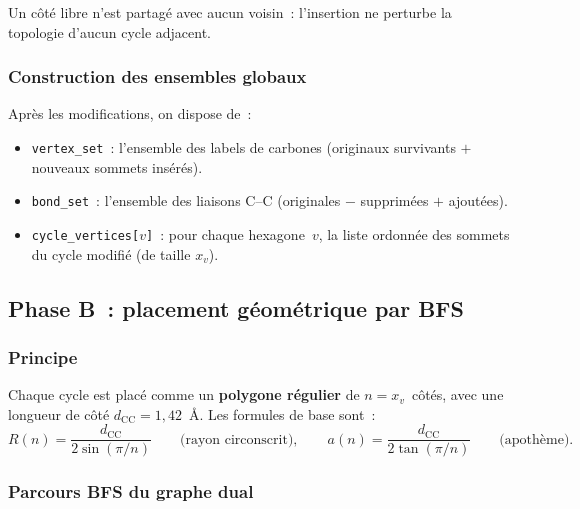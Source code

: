 \documentclass[12pt,a4paper]{article}
\theoremstyle{definition}
\theoremstyle{remark}
\begin{document}
Un c\^ot\'e libre n'est partag\'e avec aucun voisin~: l'insertion ne
perturbe la topologie d'aucun cycle adjacent.

\subsubsection{Construction des ensembles globaux}

Apr\`es les modifications, on dispose de~:
\begin{itemize}[nosep]
  \item \texttt{vertex\_set}~: l'ensemble des labels de carbones
        (originaux survivants $+$ nouveaux sommets ins\'er\'es).
  \item \texttt{bond\_set}~: l'ensemble des liaisons C--C
        (originales $-$ supprim\'ees $+$ ajout\'ees).
  \item \texttt{cycle\_vertices[$v$]}~: pour chaque hexagone~$v$, la liste
        ordonn\'ee des sommets du cycle modifi\'e (de taille $x_v$).
\end{itemize}


\subsection{Phase B~: placement g\'eom\'etrique par BFS}

\subsubsection{Principe}

Chaque cycle est plac\'e comme un \textbf{polygone r\'egulier} de
$n = x_v$~c\^ot\'es, avec une longueur de c\^ot\'e $d_{\text{CC}} = 1{,}42$~\AA.
Les formules de base sont~:
\[
  R(n) = \frac{d_{\text{CC}}}{2\sin(\pi/n)}
  \qquad\text{(rayon circonscrit)},\qquad
  a(n) = \frac{d_{\text{CC}}}{2\tan(\pi/n)}
  \qquad\text{(apoth\`eme)}.
\]

\subsubsection{Parcours BFS du graphe dual}
\end{document}
